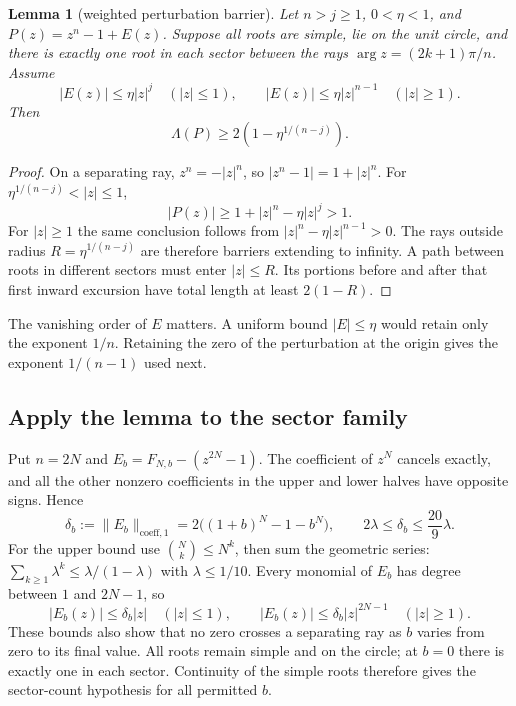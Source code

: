 \documentclass[11pt,a4paper]{article}
\newtheorem{lemma}[theorem]{Lemma}
\theoremstyle{remark}\newtheorem{remark}[theorem]{Remark}
\begin{document}
\begin{lemma}[weighted perturbation barrier]\label{lem:barrier}
Let $n>j\ge1$, $0<\eta<1$, and $P(z)=z^n-1+E(z)$.
Suppose all roots are simple, lie on the unit circle, and there is exactly
one root in each sector between the rays
$\arg z=(2k+1)\pi/n$. Assume
\[
 |E(z)|\le\eta |z|^j\quad(|z|\le1),\qquad
 |E(z)|\le\eta |z|^{n-1}\quad(|z|\ge1).
\]
Then
\[
 \Lambda(P)\ge2\left(1-\eta^{1/(n-j)}\right).
\]
\end{lemma}
\begin{proof}
On a separating ray, $z^n=-|z|^n$, so
$|z^n-1|=1+|z|^n$. For $\eta^{1/(n-j)}<|z|\le1$,
\[
 |P(z)|\ge1+|z|^n-\eta |z|^j>1.
\]
For $|z|\ge1$ the same conclusion follows from
$|z|^n-\eta |z|^{n-1}>0$. The rays outside radius
$R=\eta^{1/(n-j)}$ are therefore barriers extending to infinity.
A path between roots in different sectors must enter $|z|\le R$.
Its portions before and after that first inward excursion have total length
at least $2(1-R)$.
\end{proof}

The vanishing order of $E$ matters. A uniform bound $|E|\le\eta$ would
retain only the exponent $1/n$. Retaining the zero of the perturbation at
the origin gives the exponent $1/(n-1)$ used next.

\subsection{Apply the lemma to the sector family}

Put $n=2N$ and $E_b=F_{N,b}-(z^{2N}-1)$.
The coefficient of $z^N$ cancels exactly, and all the other nonzero
coefficients in the upper and lower halves have opposite signs. Hence
\begin{equation}\label{eq:delta}
 \delta_b:=\|E_b\|_{\mathrm{coeff},1}
 =2\bigl((1+b)^N-1-b^N\bigr),\qquad
 2\lambda\le\delta_b\le\frac{20}{9}\lambda.
\end{equation}
For the upper bound use $\binom Nk\le N^k$, then sum the geometric series:
$\sum_{k\ge1}\lambda^k\le\lambda/(1-\lambda)$ with $\lambda\le1/10$.
Every monomial of $E_b$ has degree between $1$ and $2N-1$, so
\[
 |E_b(z)|\le\delta_b|z|\quad(|z|\le1),\qquad
 |E_b(z)|\le\delta_b|z|^{2N-1}\quad(|z|\ge1).
\]
These bounds also show that no zero crosses a separating ray as $b$ varies
from zero to its final value. All roots remain simple and on the circle;
at $b=0$ there is exactly one in each sector. Continuity of the simple roots
therefore gives the sector-count hypothesis for all permitted $b$.
\end{document}
